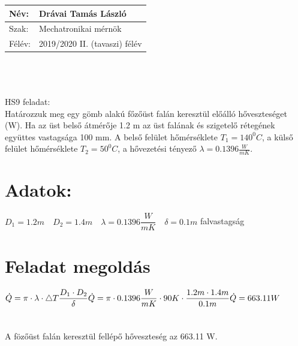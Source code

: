 \documentclass[12pt, a4paper, onecolumn]{article}
\begin{document}
\begin{tabular}{ | p{1.5cm} | p{11cm} | } 
	\hline
	Név: & Drávai Tamás László\\ 
	\hline
	Szak: & Mechatronikai mérnök \\ 
	\hline
	Félév: & 2019/2020 II. (tavaszi) félév \\ 
\hline
\end{tabular}
\\
\\
\\HS9 feladat:\\
Határozzuk meg egy gömb alakú főzőüst falán keresztül előálló hőveszteséget (W).  Ha az üst belső átmérője 1.2 m az üst falának és szigetelő rétegének együttes vastagsága 100 mm. A belső felület hőmérséklete $T_1=140^0 C$, a külső felület hőmérséklete $T_2=50^0 C$, a hővezetési tényező $\lambda= 0.1396\frac{W}{mK}$.
\section*{ {Adatok:}}
$D_1=1.2 m \quad D_2=1.4 m \quad \lambda=0.1396  \dfrac{W}{mK} \quad \delta=0.1m$ falvastagság \\


\section*{Feladat megoldás}
$
\dot{Q} =\pi\cdot \lambda\cdot\bigtriangleup T \dfrac{D_1 \cdot D_2}{\delta}
\\
\\
\dot{Q}=\pi \cdot 0.1396 \dfrac{W}{mK} \cdot  90K \cdot\dfrac{1.2m \cdot 1.4 m}{0.1m}\\
\\
\dot{Q}=663.11 W $\\
\\
\\
A fözőüst falán keresztül fellépő hőveszteség az 663.11 W.\\
\end{document}
